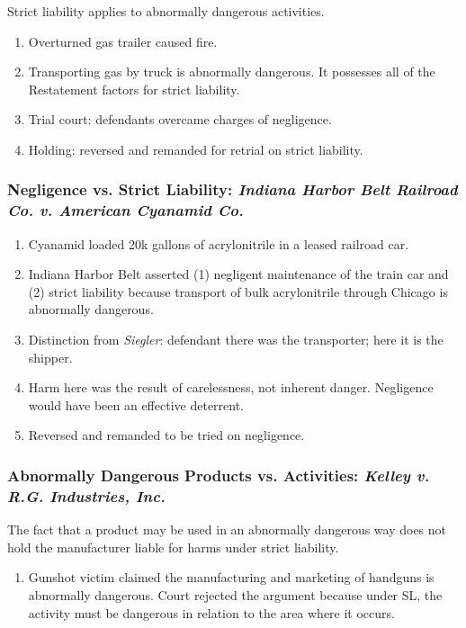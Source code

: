 Strict liability applies to abnormally dangerous activities.

\begin{enumerate}
    \item Overturned gas trailer caused fire.
    \item Transporting gas by truck is abnormally dangerous. It possesses all of 
    the Restatement factors for strict liability.
    \item Trial court: defendants overcame charges of negligence.
    \item Holding: reversed and remanded for retrial on strict liability.
\end{enumerate}

\subsubsection{Negligence vs. Strict Liability: \emph{Indiana Harbor Belt 
Railroad Co. v. American Cyanamid Co.}}

\begin{enumerate}
    \item Cyanamid loaded 20k gallons of acrylonitrile in a leased railroad car.
    \item Indiana Harbor Belt asserted (1) negligent maintenance of the train 
    car and (2) strict liability because transport of bulk acrylonitrile through 
    Chicago is abnormally dangerous.
    \item Distinction from \emph{Siegler}: defendant there was the transporter; 
    here it is the shipper.
    \item Harm here was the result of carelessness, not inherent danger.  
    Negligence would have been an effective deterrent.
    \item Reversed and remanded to be tried on negligence.
\end{enumerate}

\subsubsection{Abnormally Dangerous Products vs. Activities: \emph{Kelley v. 
R.G. Industries, Inc.}}

The fact that a product may be used in an abnormally dangerous way does not 
hold the manufacturer liable for harms under strict liability.

\begin{enumerate}
    \item Gunshot victim claimed the manufacturing and marketing of handguns is 
    abnormally dangerous. Court rejected the argument because under SL, the 
    activity must be dangerous in relation to the area where it occurs.
\end{enumerate}

